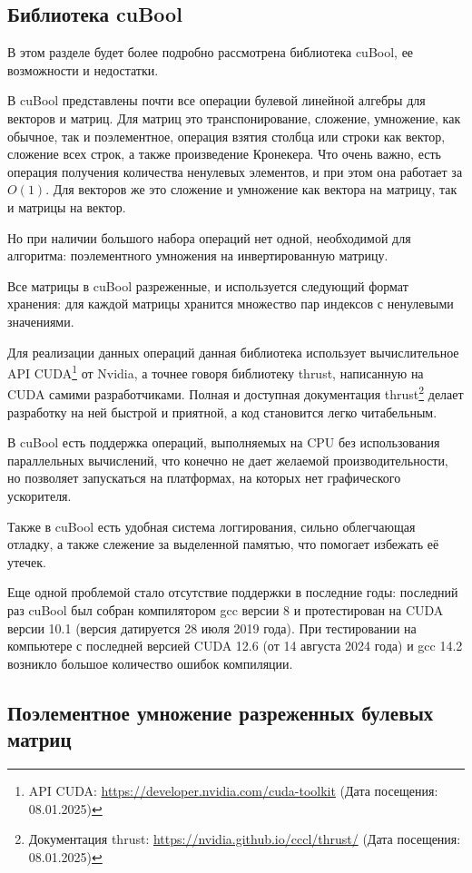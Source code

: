 \subsection{Библиотека cuBool}
В этом разделе будет более подробно рассмотрена библиотека cuBool, ее возможности и недостатки.

В cuBool представлены почти все операции булевой линейной алгебры для векторов и матриц. Для матриц это транспонирование, сложение, умножение, как обычное, так и поэлементное, операция взятия столбца или строки как вектор, сложение всех строк, а также произведение Кронекера. Что очень важно, есть операция получения количества ненулевых элементов, и при этом она работает за $O(1)$. Для векторов же это сложение и умножение как вектора на матрицу, так и матрицы на вектор.

Но при наличии большого набора операций нет одной, необходимой для алгоритма: поэлементного умножения на инвертированную матрицу.

Все матрицы в cuBool разреженные, и используется следующий формат хранения: для каждой матрицы хранится множество пар индексов с ненулевыми значениями.  

Для реализации данных операций данная библиотека использует вычислительное API CUDA\footnote{API CUDA: \url{https://developer.nvidia.com/cuda-toolkit} (Дата посещения: 08.01.2025)} от Nvidia, а точнее говоря библиотеку thrust, написанную на CUDA самими разработчиками. Полная и доступная документация thrust\footnote{Документация thrust: \url{https://nvidia.github.io/cccl/thrust/} (Дата посещения: 08.01.2025)} делает разработку на ней быстрой и приятной, а код становится легко читабельным.

В cuBool есть поддержка операций, выполняемых на CPU без использования параллельных вычислений, что конечно не дает желаемой производительности, но позволяет запускаться на платформах, на которых нет графического ускорителя.

Также в cuBool есть удобная система логгирования, сильно облегчающая отладку, а также слежение за выделенной памятью, что помогает избежать её утечек.

Еще одной проблемой стало отсутствие поддержки в последние годы: последний раз cuBool был собран компилятором gcc версии 8 и протестирован на CUDA версии 10.1 (версия датируется 28 июля 2019 года). При тестировании на компьютере с последней версией CUDA 12.6 (от 14 августа 2024 года) и gcc 14.2 возникло большое количество ошибок компиляции.

\subsection{Поэлементное умножение разреженных булевых матриц}

